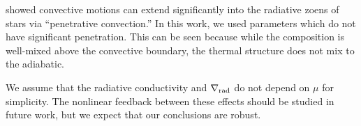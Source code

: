 \citet{anders_etal_2022} showed convective motions can extend significantly into the radiative zoens of stars via ``penetrative convection.''
In this work, we used parameters which do not have significant penetration.
This can be seen because while the composition is well-mixed above the convective boundary, the thermal structure does not mix to the adiabatic.

We assume that the radiative conductivity and $\nabla_{\rm{rad}}$ do not depend on $\mu$ for simplicity.
The nonlinear feedback between these effects should be studied in future work, but we expect that our conclusions are robust.

